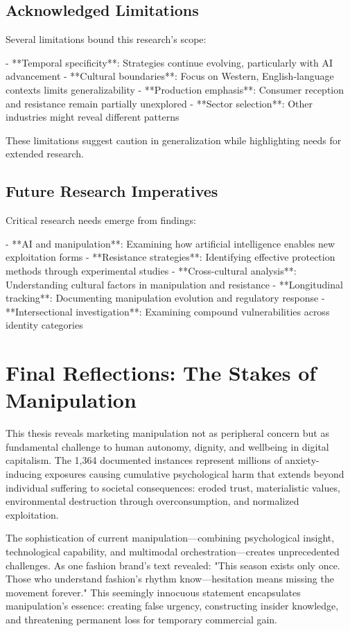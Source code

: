 \subsection{Acknowledged Limitations}

Several limitations bound this research's scope:

- **Temporal specificity**: Strategies continue evolving, particularly with AI advancement
- **Cultural boundaries**: Focus on Western, English-language contexts limits generalizability
- **Production emphasis**: Consumer reception and resistance remain partially unexplored
- **Sector selection**: Other industries might reveal different patterns

These limitations suggest caution in generalization while highlighting needs for extended research.

\subsection{Future Research Imperatives}

Critical research needs emerge from findings:

- **AI and manipulation**: Examining how artificial intelligence enables new exploitation forms
- **Resistance strategies**: Identifying effective protection methods through experimental studies
- **Cross-cultural analysis**: Understanding cultural factors in manipulation and resistance
- **Longitudinal tracking**: Documenting manipulation evolution and regulatory response
- **Intersectional investigation**: Examining compound vulnerabilities across identity categories

\section{Final Reflections: The Stakes of Manipulation}
\label{sec:final_reflections}

This thesis reveals marketing manipulation not as peripheral concern but as fundamental challenge to human autonomy, dignity, and wellbeing in digital capitalism. The 1,364 documented instances represent millions of anxiety-inducing exposures causing cumulative psychological harm that extends beyond individual suffering to societal consequences: eroded trust, materialistic values, environmental destruction through overconsumption, and normalized exploitation.

The sophistication of current manipulation—combining psychological insight, technological capability, and multimodal orchestration—creates unprecedented challenges. As one fashion brand's text revealed: "This season exists only once. Those who understand fashion's rhythm know—hesitation means missing the movement forever." This seemingly innocuous statement encapsulates manipulation's essence: creating false urgency, constructing insider knowledge, and threatening permanent loss for temporary commercial gain.

